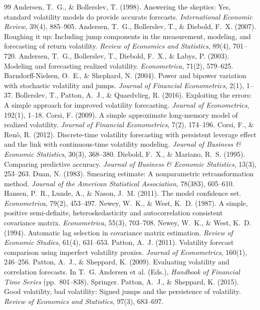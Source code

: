 \documentclass[11pt,a4paper]{article}
\begin{document}
\begin{thebibliography}{99}
 Andersen, T.~G., \& Bollerslev, T. (1998). Answering the skeptics: Yes, standard volatility models do provide accurate forecasts. \emph{International Economic Review}, 39(4), 885--905.
 Andersen, T.~G., Bollerslev, T., \& Diebold, F.~X. (2007). Roughing it up: Including jump components in the measurement, modeling, and forecasting of return volatility. \emph{Review of Economics and Statistics}, 89(4), 701--720.
 Andersen, T.~G., Bollerslev, T., Diebold, F.~X., \& Labys, P. (2003). Modeling and forecasting realized volatility. \emph{Econometrica}, 71(2), 579--625.
 Barndorff-Nielsen, O.~E., \& Shephard, N. (2004). Power and bipower variation with stochastic volatility and jumps. \emph{Journal of Financial Econometrics}, 2(1), 1--37.
 Bollerslev, T., Patton, A.~J., \& Quaedvlieg, R. (2016). Exploiting the errors: A simple approach for improved volatility forecasting. \emph{Journal of Econometrics}, 192(1), 1--18.
 Corsi, F. (2009). A simple approximate long-memory model of realized volatility. \emph{Journal of Financial Econometrics}, 7(2), 174--196.
 Corsi, F., \& Ren\`o, R. (2012). Discrete-time volatility forecasting with persistent leverage effect and the link with continuous-time volatility modeling. \emph{Journal of Business \& Economic Statistics}, 30(3), 368--380.
 Diebold, F.~X., \& Mariano, R.~S. (1995). Comparing predictive accuracy. \emph{Journal of Business \& Economic Statistics}, 13(3), 253--263.
 Duan, N. (1983). Smearing estimate: A nonparametric retransformation method. \emph{Journal of the American Statistical Association}, 78(383), 605--610.
 Hansen, P.~R., Lunde, A., \& Nason, J.~M. (2011). The model confidence set. \emph{Econometrica}, 79(2), 453--497.
 Newey, W.~K., \& West, K.~D. (1987). A simple, positive semi-definite, heteroskedasticity and autocorrelation consistent covariance matrix. \emph{Econometrica}, 55(3), 703--708.
 Newey, W.~K., \& West, K.~D. (1994). Automatic lag selection in covariance matrix estimation. \emph{Review of Economic Studies}, 61(4), 631--653.
 Patton, A.~J. (2011). Volatility forecast comparison using imperfect volatility proxies. \emph{Journal of Econometrics}, 160(1), 246--256.
 Patton, A.~J., \& Sheppard, K. (2009). Evaluating volatility and correlation forecasts. In T.~G. Andersen et al. (Eds.), \emph{Handbook of Financial Time Series} (pp.~801--838). Springer.
 Patton, A.~J., \& Sheppard, K. (2015). Good volatility, bad volatility: Signed jumps and the persistence of volatility. \emph{Review of Economics and Statistics}, 97(3), 683--697.
\end{thebibliography}
\end{document}
